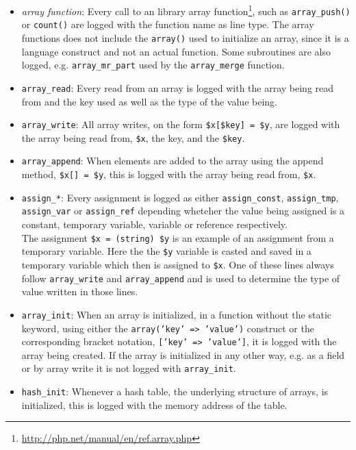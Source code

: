 \begin{itemize}
\item \emph{array function}: Every call to an library array function\footnote{\url{http://php.net/manual/en/ref.array.php}}, such as \texttt{array\_push()} or \texttt{count()} are logged with the function name as line type. The array functions does not include the \texttt{array()} used to initialize an array, since it is a language construct and not an actual function. Some subroutines are also logged, e.g. \texttt{array\_mr\_part} used by the \texttt{array\_merge} function.
\item \texttt{array\_read}: Every read from an array is logged with the array being read from and the key used as well as the type of the value being.
\item \texttt{array\_write}: All array writes, on the form \texttt{\$x[\$key] = \$y}, are logged with the array being read from, \texttt{\$x}, the key, and the \texttt{\$key}. 
\item \texttt{array\_append}: When elements are added to the array using the append method, \texttt{\$x[] = \$y}, this is logged with the array being read from, \texttt{\$x}.
\item \texttt{assign\_*}: Every assignment is logged as either \texttt{assign\_const}, \texttt{assign\_tmp}, \texttt{assign\_var} or \texttt{assign\_ref} depending wheteher the value being assigned is a constant, temporary variable, variable or reference respectively.\\
The assignment \texttt{\$x = (string) \$y} is an example of an assignment from a temporary variable. Here the the \texttt{\$y} variable is casted and saved in a temporary variable which then is assigned to \texttt{\$x}. One of these lines always follow \texttt{array\_write} and \texttt{array\_append} and is used to determine the type of value written in those lines.
\item \texttt{array\_init}: When an array is initialized, in a function without the static keyword, using either the \texttt{array('key' => 'value')} construct or the corresponding bracket notation, \texttt{['key' => 'value']}, it is logged with the array being created. If the array is initialized in any other way, e.g. as a field or by array write it is not logged with \texttt{array\_init}.
\item \texttt{hash\_init}: Whenever a hash table, the underlying structure of arrays, is initialized, this is logged with the memory address of the table.
\end{itemize}

